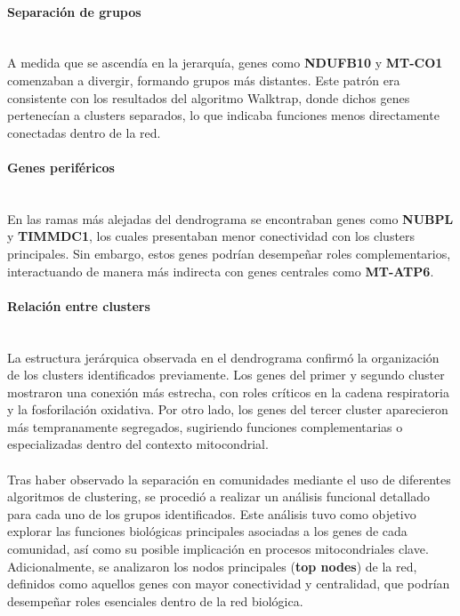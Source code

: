 \paragraph{Separación de grupos} \mbox{}\\

A medida que se ascendía en la jerarquía, genes como \textbf{NDUFB10} y \textbf{MT-CO1} comenzaban a divergir, formando grupos más distantes. Este patrón era consistente con los resultados del algoritmo Walktrap, donde dichos genes pertenecían a clusters separados, lo que indicaba funciones menos directamente conectadas dentro de la red.

\paragraph{Genes periféricos} \mbox{}\\

En las ramas más alejadas del dendrograma se encontraban genes como \textbf{NUBPL} y \textbf{TIMMDC1}, los cuales presentaban menor conectividad con los clusters principales. Sin embargo, estos genes podrían desempeñar roles complementarios, interactuando de manera más indirecta con genes centrales como \textbf{MT-ATP6}.

\paragraph{Relación entre clusters} \mbox{}\\

La estructura jerárquica observada en el dendrograma confirmó la organización de los clusters identificados previamente. Los genes del primer y segundo cluster mostraron una conexión más estrecha, con roles críticos en la cadena respiratoria y la fosforilación oxidativa. Por otro lado, los genes del tercer cluster aparecieron más tempranamente segregados, sugiriendo funciones complementarias o especializadas dentro del contexto mitocondrial.

\paragraph{}

Tras haber observado la separación en comunidades mediante el uso de diferentes algoritmos de clustering, se procedió a realizar un análisis funcional detallado para cada uno de los grupos identificados. Este análisis tuvo como objetivo explorar las funciones biológicas principales asociadas a los genes de cada comunidad, así como su posible implicación en procesos mitocondriales clave. Adicionalmente, se analizaron los nodos principales (\textbf{top nodes}) de la red, definidos como aquellos genes con mayor conectividad y centralidad, que podrían desempeñar roles esenciales dentro de la red biológica.

